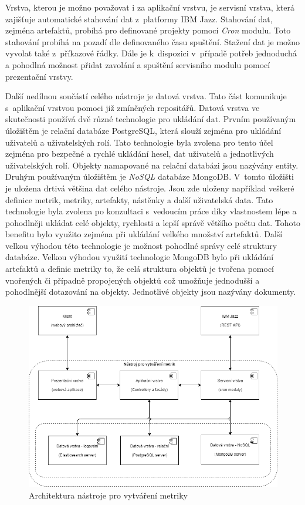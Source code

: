\documentclass[czech,master]{diploma}
\begin{document}
Vrstva, kterou je možno považovat i za aplikační vrstvu, je servisní vrstva, která zajišťuje automatické stahování dat z~platformy IBM Jazz. Stahování dat, zejména artefaktů, probíhá pro definované projekty pomocí \textit{Cron} modulu. Toto stahování probíhá na pozadí dle definovaného času spuštění. Stažení dat je možno vyvolat také z~příkazové řádky. Dále je k~dispozici v~případě potřeb jednoduchá a pohodlná možnost přidat zavolání a spuštění servisního modulu pomocí prezentační vrstvy.

Další nedílnou součástí celého nástroje je datová vrstva. Tato část komunikuje s~aplikační vrstvou pomoci již zmíněných repositářů. Datová vrstva ve skutečnosti používá dvě různé technologie pro ukládání dat. Prvním používaným úložištěm je relační databáze PostgreSQL, která slouží zejména pro ukládání uživatelů a uživatelských rolí. Tato technologie byla zvolena pro tento účel zejména pro bezpečné a rychlé ukládání hesel, dat uživatelů a jednotlivých uživatelských rolí. Objekty namapované na relační databázi jsou nazývány entity. Druhým používaným úložištěm je \textit{NoSQL} databáze MongoDB. V~tomto úložišti je uložena drtivá většina dat celého nástroje. Jsou zde uloženy například veškeré definice metrik, metriky, artefakty, nástěnky a další uživatelská data. Tato technologie byla zvolena po konzultaci s~vedoucím práce díky vlastnostem lépe a pohodlněji ukládat celé objekty, rychlosti a lepší správě většího počtu dat. Tohoto benefitu bylo využito zejména při ukládání velkého množství artefaktů. Další velkou výhodou této technologie je možnost pohodlné správy celé struktury databáze. Velkou výhodou využití technologie MongoDB bylo při ukládání artefaktů a definic metriky to, že celá struktura objektů je tvořena pomocí vnořených či případně propojených objektů což umožňuje jednodušší a pohodlnější dotazování na objekty. Jednotlivé objekty jsou nazývány dokumenty.


\begin{figure}[!ht]
    \centering
    \includegraphics[width=1\textwidth]{Diplomka/Figures/architektura.png}
    \caption{Architektura nástroje pro vytváření metriky}
    \label{fig:architektura_nastroje}
\end{figure}
\end{document}
